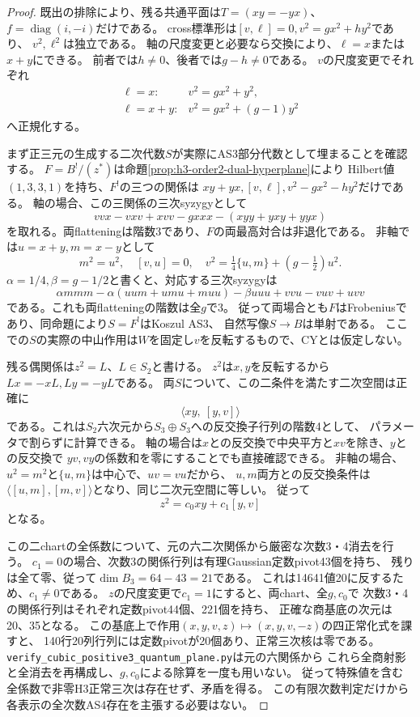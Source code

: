 \begin{proof}
既出の排除により、残る共通平面は$T=(xy=-yx)$、
$f=\operatorname{diag}(i,-i)$だけである。
cross標準形は$[v,\ell]=0,v^2=gx^2+hy^2$であり、
$v^2,\ell^2$は独立である。
軸の尺度変更と必要なら交換により、$\ell=x$または$x+y$にできる。
前者では$h\ne0$、後者では$g-h\ne0$である。
$v$の尺度変更でそれぞれ
\[
 \begin{array}{ll}
 \ell=x:&v^2=gx^2+y^2,\\
 \ell=x+y:&v^2=gx^2+(g-1)y^2
 \end{array}
\]
へ正規化する。

まず正三元の生成する二次代数$S$が実際にAS3部分代数として埋まることを確認する。
$F=B^!/(z^*)$は命題\ref{prop:h3-order2-dual-hyperplane}により
Hilbert値$(1,3,3,1)$を持ち、$F^!$の三つの関係は
$xy+yx,[v,\ell],v^2-gx^2-hy^2$だけである。
軸の場合、この三関係の三次syzygyとして
\[
 vv x-vxv+xvv-gxxx-(xyy+yxy+yyx)
\]
を取れる。両flatteningは階数3であり、$F$の両最高対合は非退化である。
非軸では$u=x+y,m=x-y$として
\[
 m^2=u^2,\quad[v,u]=0,\quad
 v^2=\tfrac14\{u,m\}+(g-\tfrac12)u^2.
\]
$\alpha=1/4,\beta=g-1/2$と書くと、対応する三次syzygyは
\[
 \alpha mmm-\alpha(uum+umu+muu)-\beta uuu
       +vvu-vuv+uvv
\]
である。これも両flatteningの階数は全$g$で3。
従って両場合とも$F$はFrobeniusであり、同命題により$S=F^!$はKoszul AS3、
自然写像$S\to B$は単射である。
ここでの$S$の実際の中山作用は$W$を固定し$v$を反転するもので、CYとは仮定しない。

残る偶関係は$z^2=L$、$L\in S_2$と書ける。
$z^2$は$x,y$を反転するから$Lx=-xL,Ly=-yL$である。
両$S$について、この二条件を満たす二次空間は正確に
\[
 \langle xy,\ [y,v]\rangle
\]
である。これは$S_2$六次元から$S_3\oplus S_3$への反交換子行列の階数4として、
パラメータで割らずに計算できる。
軸の場合は$x$との反交換で中央平方と$xv$を除き、$y$との反交換で
$yv,vy$の係数和を零にすることでも直接確認できる。
非軸の場合、$u^2=m^2$と$\{u,m\}$は中心で、$uv=vu$だから、
$u,m$両方との反交換条件は
$\langle [u,m],[m,v]\rangle$となり、同じ二次元空間に等しい。
従って
\[
 z^2=c_0xy+c_1[y,v]
\]
となる。

この二chartの全係数について、元の六二次関係から厳密な次数3・4消去を行う。
$c_1=0$の場合、次数3の関係行列は有理Gaussian定数pivot43個を持ち、
残りは全て零、従って$\dim B_3=64-43=21$である。
これは14641値20に反するため、$c_1\ne0$である。
$z$の尺度変更で$c_1=1$にすると、両chart、全$g,c_0$で
次数3・4の関係行列はそれぞれ定数pivot44個、221個を持ち、
正確な商基底の次元は20、35となる。
この基底上で作用$(x,y,v,z)\mapsto(x,y,v,-z)$の四正常化式を課すと、
140行20列行列には定数pivotが20個あり、正常三次核は零である。
\texttt{verify\_cubic\_positive3\_quantum\_plane.py}は元の六関係から
これら全商射影と全消去を再構成し、$g,c_0$による除算を一度も用いない。
従って特殊値を含む全係数で非零H3正常三次は存在せず、矛盾を得る。
この有限次数判定だけから各表示の全次数AS4存在を主張する必要はない。
\end{proof}

